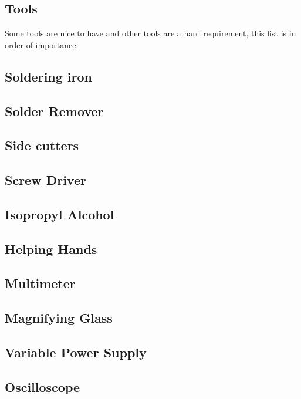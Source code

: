 \documentclass{ol-softwaremanual}
\begin{document}
\begin{ffcode}
\subsection{Tools}
Some tools are nice to have and other tools are a hard requirement, this list is in order of importance.

\subsection{Soldering iron}
\subsection{Solder Remover}
\subsection{Side cutters}
\subsection{Screw Driver}
\subsection{Isopropyl Alcohol}
\subsection{Helping Hands}
\subsection{Multimeter}
\subsection{Magnifying Glass}
\subsection{Variable Power Supply}
\subsection{Oscilloscope}

\pagebreak


\end{ffcode}
\end{document}
